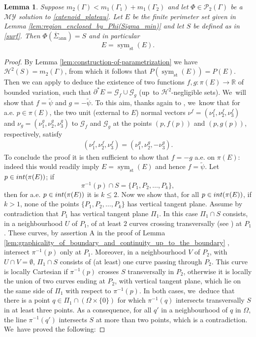 \documentclass[11pt]{article}
\numberwithin{equation}{section}
\DeclareMathOperator{\sym}{sym}
\newcommand{\R}{\mathbb{R}}
\let\Om\Omega
\newcommand{\immclosedann}{\Phi({\overline\Sigma}_\mathrm{ann})}
\newtheorem{lemma}[theorem]{Lemma}
\theoremstyle{definition}
\begin{document}
\begin{lemma}\label{lemma_step5}
Suppose $m_2(\Gamma)<m_1(\Gamma_1)+m_1(\Gamma_2)$ and let $\Phi\in\mathcal{P}_2(\Gamma)$ be a $\mathcal{MY}$ solution to \eqref{catenoid_plateau}. Let $E$ be the finite perimeter set given in Lemma \ref{lem:region_enclosed_by_Phi(Sigma_min)} and let $S$ be defined as in \eqref{surf}. Then
$\immclosedann=S$
and in particular
\[
E=\sym_\mathrm{st}(E).
\]
\end{lemma}

\begin{proof} By Lemma \ref{lem:construction-of-parametrization} we have $\mathcal H^2(S)=m_2(\Gamma)$, from which it follows that
$P(\sym_\mathrm{st}(E))= P(E)$. Then we can apply \cite[Th.\,1.1]{CCF}
to deduce the existence of two functions
$f,g:\pi(E)\to \R$ of bounded variation, such that $\partial^* E=\mathcal G_f\cup\mathcal G_{g}$ (up~to $\mathcal H^2$-negligible sets). We~will show that $f=\widetilde\psi$ and $g=-\widetilde\psi$. To this aim,
thanks again to \cite[Th.\,1.1]{CCF}, we~know that for a.e. $p\in \pi(E)$, the two unit (external to $E$) normal
vectors $\nu^f=(\nu^f_1,\nu^f_2,\nu^f_3)$ and $\nu_g=(\nu^g_1,\nu^g_2,\nu^g_3)$ to $\mathcal G_f$ and $\mathcal G_g$ at the points $(p,f(p))$ and $(p,g(p))$, respectively, satisfy\enlargethispage{2pt}
\begin{align}\label{normals}
(\nu^f_1,\nu^f_2,\nu^f_3)=(\nu^g_1,\nu^g_2,-\nu^g_3).
\end{align}
To conclude the proof it is then sufficient to show that $f=-g$ a.e. on $\pi(E)$: indeed this would readily imply $E=\sym_\mathrm{st}(E)$ and hence $f=\widetilde\psi$.
Let $p\in \textup{int}(\pi(E))$; if
\begin{equation}
\pi^{-1}(p)\cap S=\{P_1,P_2,\dots,P_k\},
\end{equation}
then for a.e. $p\in \textup{int}(\pi(E))$ it is $k\leq2$.
Now we show that, for all $p\in \textup{int}(\pi(E))$, if $k>1$, none of the points $\{P_1,P_2,\dots,P_k\}$ has vertical tangent plane.
Assume by contradiction that $P_1$ has vertical tangent plane $\Pi_1$. In this case $\Pi_1\cap S$ consists, in a neighbourhood $U$ of $P_1$, of at least $2$ curves crossing {transversally} (see \cite[\S 373]{Nitsche:89}) at $P_1$. These curves, by assertion A in the proof of Lemma \ref{lem:graphicality_of_boundary_and_continuity_up_to_the_boundary} , intersect $\pi^{-1}(p)$ only at $P_1$. Moreover, in a neighbourhood $V$ of $P_2$, with $U\cap V=\emptyset$, $\Pi_1\cap S$ consists of (at least) one
curve passing through $P_2$. This curve is locally Cartesian if $\pi^{-1}(p)$ crosses $S$ transversally in $P_2$, otherwise it is
locally the union of two curves ending at $P_2$, with vertical tangent plane, which lie on the same side of $\Pi_1$ with respect to $\pi^{-1}(p)$. In both cases, we~deduce that there is a point $q\in \Pi_1\cap (\Om\times\{0\})$ for which $\pi^{-1}(q)$ intersects transversally $S$ in at least three points. As a consequence, for all $q'$ in a neighbourhood of $q$ in
$\Om$, the line $\pi^{-1}(q')$ intersects $S$ at more than two points, which is a contradiction. We~have proved the following:


\end{proof}
\end{document}
